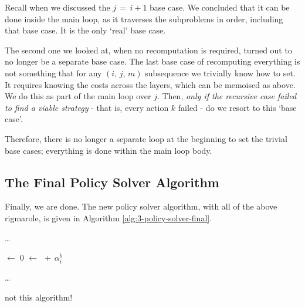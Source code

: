 Recall when we discussed the \(j\,=\,i+1\) base case.
We concluded that it can be done inside the main loop, as it traverses the subproblems in order, including that base case.
It is the only `real' base case.

The second one we looked at, when no recomputation is required, turned out to no longer be a separate base case.
The last base case of recomputing everything is not something that for any \((i,\,j,\,m)\) subsequence we trivially know how to set.
It requires knowing the costs across the layers, which can be memoised as above.
We do this as part of the main loop over \(j\).
Then, \textit{only if the recursive case failed to find a viable strategy} - that is, every action \(k\) failed - do we resort to this `base case'.

Therefore, there is no longer a separate loop at the beginning to set the trivial base cases; everything is done within the main loop body.

\subsection{The Final Policy Solver Algorithm}
Finally, we are done.
The new policy solver algorithm, with all of the above rigmarole, is given in Algorithm \ref{alg:3-policy-solver-final}.

\begin{algorithm}[htb]
    \DontPrintSemicolon

    \ldots\;
    \BlankLine

    \ComputeF \(\leftarrow\; 0\)\;
    \ComputeQuad \(\leftarrow\;\)\ComputeF\(\,+\, \alpha^b_i\)\;
    \BlankLine

    \ldots\;
    \caption{not this algorithm!}
    \label{alg:3-policy-solver-final}
\end{algorithm}
